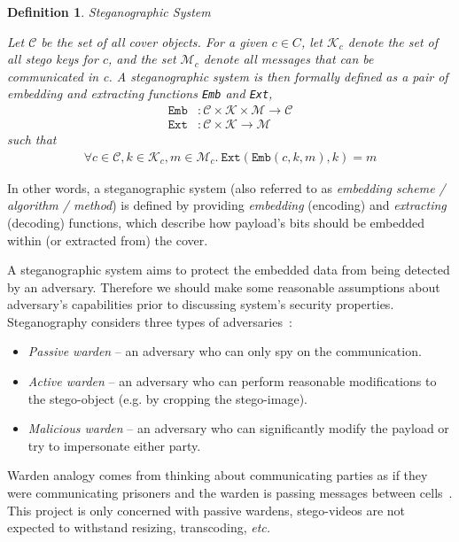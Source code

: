 \documentclass[12pt,british,twoside,notitlepage,usenames,dvipsnames,hypens,final]{report}
\newtheorem{definition}{Definition}
\numberwithin{equation}{section}
\numberwithin{figure}{section}
\begin{document}
\begin{definition}{Steganographic System}

Let $\mathcal{C}$ be the set of all cover objects. For a given $c \in C$, let $\mathcal{K}_c$ denote the set of all stego keys for $c$, and the set $\mathcal{M}_c$ denote all messages that can be communicated in c. A steganographic system is then formally defined as a pair of embedding and extracting functions \texttt{Emb} and \texttt{Ext},
\begin{align*}
\texttt{Emb} &: \mathcal{C} \times \mathcal{K} \times \mathcal{M} \rightarrow \mathcal{C} \\
\texttt{Ext} &: \mathcal{C} \times \mathcal{K} \rightarrow \mathcal{M}
\end{align*}
such that
\begin{align*}
\forall c \in \mathcal{C}, k \in \mathcal{K}_c, m \in \mathcal{M}_c . ~ \texttt{Ext}(\texttt{Emb}(c, k, m), k) = m
\end{align*}

\end{definition}

In other words, a steganographic system (also referred to as \emph{embedding scheme / algorithm / method}) is defined by providing \emph{embedding} (encoding) and \emph{extracting} (decoding) functions, which describe how payload's bits should be embedded within (or extracted from) the cover.

A steganographic system aims to protect the embedded data from being detected by an adversary. Therefore we should make some reasonable assumptions about adversary's capabilities prior to discussing system's security properties. Steganography considers three types of adversaries~\cite{craver1998public}:
\begin{itemize}
\item \emph{Passive warden} -- an adversary who can only spy on the communication.
\item \emph{Active warden} -- an adversary who can perform reasonable modifications to the stego-object (e.g. by cropping the stego-image).
\item \emph{Malicious warden} -- an adversary who can significantly modify the payload or try to impersonate either party.
\end{itemize}
Warden analogy comes from thinking about communicating parties as if they were communicating prisoners and the warden is passing messages between cells~\cite{craver1998public}. 
This project is only concerned with passive wardens, stego-videos are not expected to withstand resizing, transcoding, \emph{etc.}
\end{document}
